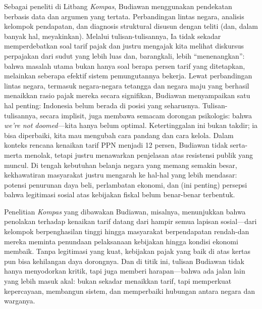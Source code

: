 Sebagai peneliti di Litbang \textit{Kompas}, Budiawan menggunakan pendekatan berbasis data dan argumen yang tertata. Perbandingan lintas negara, analisis kelompok pendapatan, dan diagnosis struktural disusun dengan teliti (dan, dalam banyak hal, meyakinkan). Melalui tulisan-tulisannya, Ia tidak sekadar memperdebatkan soal tarif pajak dan justru mengajak kita melihat diskursus perpajakan dari sudut yang lebih luas dan, barangkali, lebih ``menenangkan'': bahwa masalah utama bukan hanya soal berapa persen tarif yang ditetapkan, melainkan seberapa efektif sistem pemungutannya bekerja. Lewat perbandingan lintas negara, termasuk negara-negara tetangga dan negara maju yang berhasil menaikkan rasio pajak mereka secara signifikan, Budiawan menyampaikan satu hal penting: Indonesia belum berada di posisi yang seharusnya. Tulisan-tulisannya, secara implisit, juga membawa semacam dorongan psikologis: bahwa \textit{we’re not doomed}—kita hanya belum optimal. Ketertinggalan ini bukan takdir; ia bisa diperbaiki,  kita mau mengubah cara pandang dan cara kelola. Dalam konteks rencana kenaikan tarif PPN menjadi 12 persen, Budiawan tidak serta-merta menolak, tetapi justru menawarkan penjelasan atas resistensi publik yang muncul. Di tengah kebutuhan belanja negara yang memang semakin besar, kekhawatiran masyarakat justru mengarah ke hal-hal yang lebih mendasar: potensi penurunan daya beli, perlambatan ekonomi, dan (ini penting) persepsi bahwa legitimasi sosial atas kebijakan fiskal belum benar-benar terbentuk.

Penelitian \textit{Kompas} yang dibawakan Budiawan, misalnya, menunjukkan bahwa penolakan terhadap kenaikan tarif datang dari hampir semua lapisan sosial—dari kelompok berpenghasilan tinggi hingga masyarakat berpendapatan rendah-dan mereka meminta penundaan pelaksanaan kebijakan hingga kondisi ekonomi membaik. Tanpa legitimasi yang kuat, kebijakan pajak yang baik di atas kertas pun bisa kehilangan daya dorongnya. Dan di titik ini, tulisan Budiawan tidak hanya menyodorkan kritik, tapi juga memberi harapan—bahwa ada jalan lain yang lebih masuk akal: bukan sekadar menaikkan tarif, tapi memperkuat kepercayaan, membangun sistem, dan memperbaiki hubungan antara negara dan warganya.

